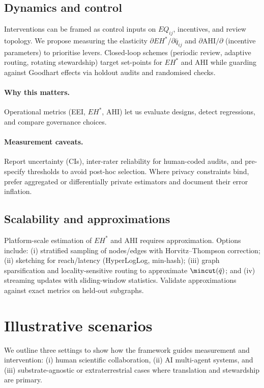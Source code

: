 \documentclass[12pt]{article}
\begin{document}
\subsection{Dynamics and control}
Interventions can be framed as control inputs on $EQ_{ij}$, incentives, and review topology. We propose measuring the elasticity $\partial EH^{\ast}/\partial \bar{q}_{ij}$ and $\partial \mathrm{AHI}/\partial$ (incentive parameters) to prioritise levers. Closed-loop schemes (periodic review, adaptive routing, rotating stewardship) target set-points for $EH^{\ast}$ and AHI while guarding against Goodhart effects via holdout audits and randomised checks.

\paragraph{Why this matters.} Operational metrics (EEI, $EH^{\ast}$, AHI) let us evaluate designs, detect regressions, and compare governance choices.

\paragraph{Measurement caveats.} Report uncertainty (CIs), inter-rater reliability for human-coded audits, and pre-specify thresholds to avoid post-hoc selection. Where privacy constraints bind, prefer aggregated or differentially private estimators and document their error inflation.

\subsection{Scalability and approximations}
Platform-scale estimation of $EH^{\ast}$ and AHI requires approximation. Options include: (i) stratified sampling of nodes/edges with Horvitz--Thompson correction; (ii) sketching for reach/latency (HyperLogLog, min-hash); (iii) graph sparsification and locality-sensitive routing to approximate $\mincut(\bar q)$; and (iv) streaming updates with sliding-window statistics. Validate approximations against exact metrics on held-out subgraphs.
\section{Illustrative scenarios}
We outline three settings to show how the framework guides measurement and intervention: (i) human scientific collaboration, (ii) AI multi-agent systems, and (iii) substrate-agnostic or extraterrestrial cases where translation and stewardship are primary.
\end{document}
